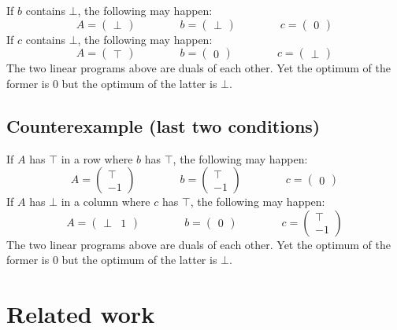 \documentclass[]{article}
\renewcommand{\.}{\hskip .75pt}
\begin{document}
If $b$ contains $\bot$, the following may happen:
$$
A = \begin{pmatrix} \bot \end{pmatrix}
\qquad \qquad
b = \begin{pmatrix} \bot \end{pmatrix}
\qquad \qquad
c = \begin{pmatrix} 0 \end{pmatrix}
$$
If $c$ contains $\bot$, the following may happen:
$$
A = \begin{pmatrix} \top \end{pmatrix}
\qquad \qquad
b = \begin{pmatrix} 0 \end{pmatrix}
\qquad \qquad
c = \begin{pmatrix} \bot \end{pmatrix}
$$
The two linear programs above are duals of each other.
Yet the optimum of the former is $0$
but the optimum of the latter is $\bot$.

\subsection{Counterexample (last two conditions)}

If $A$ has $\top$ in a row where $b$ has $\top$, the following may happen:
$$
A = \begin{pmatrix} \top \\ -1 \end{pmatrix}
\qquad \qquad
b = \begin{pmatrix} \top \\ -1 \end{pmatrix}
\qquad \qquad
c = \begin{pmatrix} 0 \end{pmatrix}
$$
If $A$ has $\bot$ in a column where $c$ has $\top$, the following may happen:
$$
A = \begin{pmatrix} \bot & 1 \end{pmatrix}
\qquad \qquad
b = \begin{pmatrix} 0 \end{pmatrix}
\qquad \qquad
c = \begin{pmatrix} \top \\ -1 \end{pmatrix}
$$
The two linear programs above are duals of each other.
Yet the optimum of the former is $0$
but the optimum of the latter is $\bot$.


\section {Related work}
\end{document}
